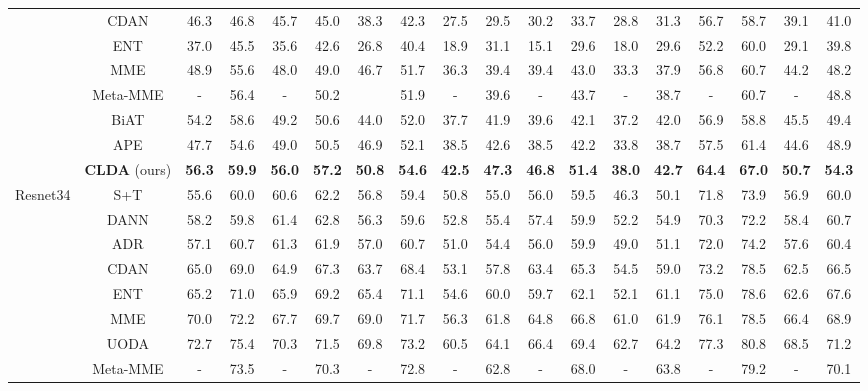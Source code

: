 \begin{table}[!t]
\begin{center}
{{\begin{tabular}{c|c|cccccccccccccc|cc}
 & CDAN     & 46.3 & 46.8 & 45.7 & 45.0 & 38.3 & 42.3 & 27.5 & 29.5 & 30.2 & 33.7 & 28.8 & 31.3 & 56.7 & 58.7 & 39.1 & 41.0 \\
 & ENT & 37.0 & 45.5 & 35.6 & 42.6 & 26.8 & 40.4 & 18.9 & 31.1 & 15.1 & 29.6 & 18.0 & 29.6 & 52.2 & 60.0 & 29.1 & 39.8 \\
 & MME & 48.9 & 55.6 & 48.0 & 49.0 & 46.7 & 51.7 & 36.3 & 39.4 & 39.4 & 43.0 & 33.3 & 37.9 & 56.8 & 60.7 & 44.2 & 48.2 \\
 & Meta-MME & - & 56.4 & - & 50.2 & & 51.9 & - & 39.6 & - & 43.7 & - & 38.7 & - & 60.7 & - & 48.8 \\
 & BiAT & 54.2 & 58.6 & 49.2 & 50.6 & 44.0 & 52.0 & 37.7 & 41.9 & 39.6 & 42.1 & 37.2 & 42.0 & 56.9 & 58.8 & 45.5 & 49.4 \\
 & APE & 47.7 & 54.6 & 49.0 & 50.5 & 46.9 & 52.1 & 38.5 & 42.6 & 38.5 & 42.2 & 33.8 & 38.7 & 57.5 & 61.4 & 44.6 & 48.9 \\
 & \textbf{CLDA} (ours) & \textbf{56.3} & \textbf{59.9} & \textbf{56.0} & \textbf{57.2} & \textbf{50.8} & \textbf{54.6} & \textbf{42.5} & \textbf{47.3} & \textbf{46.8} & \textbf{51.4} & \textbf{38.0} & \textbf{42.7} & \textbf{64.4} & \textbf{67.0} & \textbf{50.7} & \textbf{54.3} \\ 
\hline
\hline
\multirow{9}{*}{Resnet34} & S+T & 55.6 & 60.0 & 60.6 & 62.2 & 56.8 & 59.4 & 50.8 & 55.0 & 56.0 & 59.5 & 46.3 & 50.1 & 71.8 & 73.9 & 56.9 & 60.0 \\
 & DANN & 58.2 & 59.8 & 61.4 & 62.8 & 56.3 & 59.6 & 52.8 & 55.4 & 57.4 & 59.9 & 52.2 & 54.9 & 70.3 & 72.2 & 58.4 & 60.7 \\
  & ADR      & 57.1 & 60.7 & 61.3 & 61.9 & 57.0 & 60.7 & 51.0 & 54.4 & 56.0 & 59.9 & 49.0 & 51.1 & 72.0 & 74.2 & 57.6 & 60.4 \\
 & CDAN     & 65.0 & 69.0 & 64.9 & 67.3 & 63.7 & 68.4 & 53.1 & 57.8 & 63.4 & 65.3 & 54.5 & 59.0 & 73.2 & 78.5 & 62.5 & 66.5 \\
 & ENT & 65.2 & 71.0 & 65.9 & 69.2 & 65.4 & 71.1 & 54.6 & 60.0 & 59.7 & 62.1 & 52.1 & 61.1 & 75.0 & 78.6 & 62.6 & 67.6 \\
 & MME & 70.0 & 72.2 & 67.7 & 69.7 & 69.0 & 71.7 & 56.3 & 61.8 & 64.8 & 66.8 & 61.0 & 61.9 & 76.1 & 78.5 & 66.4 & 68.9 \\
 & UODA & 72.7 & 75.4 & 70.3 & 71.5 & 69.8 & 73.2 & 60.5 & 64.1 & 66.4 & 69.4 & 62.7 & 64.2 & 77.3 & 80.8 & 68.5 & 71.2 \\
 & Meta-MME & - & 73.5 & - & 70.3 & - & 72.8 & - & 62.8 & - & 68.0 & - & 63.8 & - & 79.2 & - & 70.1 \\

\end{tabular}}}
\end{center}
\end{table}

